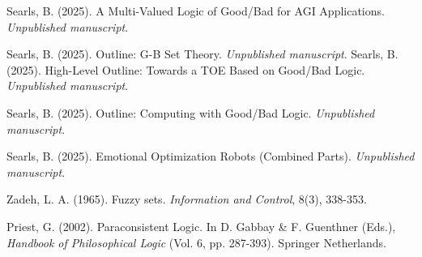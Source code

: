 \documentclass[11pt]{article}
\theoremstyle{definition}
\theoremstyle{plain}
\begin{document}
\newpage
\begin{thebibliography}{9}

Searls, B. (2025). A Multi-Valued Logic of Good/Bad for AGI Applications. \textit{Unpublished manuscript}.

Searls, B. (2025). Outline: G-B Set Theory. \textit{Unpublished manuscript}.
Searls, B. (2025). High-Level Outline: Towards a TOE Based on Good/Bad Logic. \textit{Unpublished manuscript}.

Searls, B. (2025). Outline: Computing with Good/Bad Logic. \textit{Unpublished manuscript}.

Searls, B. (2025). Emotional Optimization Robots (Combined Parts). \textit{Unpublished manuscript}.

Zadeh, L. A. (1965). Fuzzy sets. \textit{Information and Control}, 8(3), 338-353.

Priest, G. (2002). Paraconsistent Logic. In D. Gabbay \& F. Guenthner (Eds.), \textit{Handbook of Philosophical Logic} (Vol. 6, pp. 287-393). Springer Netherlands.

\end{thebibliography}
\end{document}
